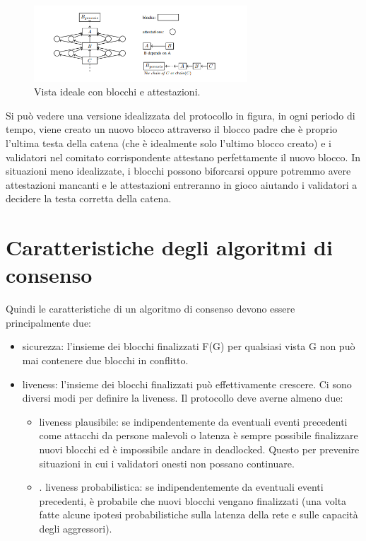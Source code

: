 \documentclass[a4paper,11pt]{report}
\begin{document}
\begin{figure}[htbp] 
\begin{center}
\includegraphics[width=8cm]{img/imgPoS.png} 
\end{center}
\caption{Vista ideale con blocchi e attestazioni.}
\end{figure}

Si può vedere una versione idealizzata del protocollo in figura, in ogni periodo di tempo, viene creato un nuovo blocco attraverso il blocco padre che è proprio l'ultima testa della catena (che è idealmente solo l'ultimo blocco creato) e i validatori nel comitato corrispondente attestano perfettamente il nuovo blocco. In situazioni meno idealizzate, i blocchi possono biforcarsi oppure potremmo avere attestazioni mancanti e le attestazioni entreranno in gioco aiutando i validatori a decidere la testa corretta della catena.

\section{Caratteristiche degli algoritmi di consenso}
Quindi le caratteristiche di un algoritmo di consenso devono essere principalmente due:
\begin{itemize}
\item sicurezza: l'insieme dei blocchi finalizzati F(G) per qualsiasi vista G non può mai contenere due blocchi in conflitto.
\item liveness: l'insieme dei blocchi finalizzati può effettivamente crescere. Ci sono diversi modi per definire la liveness. Il protocollo deve averne almeno due:
\begin{itemize}
\item liveness plausibile: se indipendentemente da eventuali eventi precedenti come attacchi da persone malevoli o latenza è sempre possibile finalizzare nuovi blocchi ed è impossibile andare in deadlocked. Questo per prevenire situazioni in cui i validatori onesti non possano continuare.
\item. liveness probabilistica: se indipendentemente da eventuali eventi precedenti, è probabile che nuovi blocchi vengano finalizzati (una volta fatte alcune ipotesi probabilistiche sulla latenza della rete e sulle capacità degli aggressori).
\end{itemize}
\end{itemize}
\end{document}
